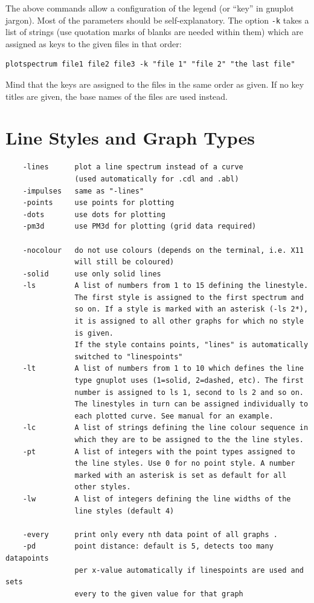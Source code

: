 \documentclass[12pt, a4paper]{article}
\begin{document}
The above commands allow a configuration of the legend (or ``key'' in gnuplot jargon). Most of the parameters should be self-explanatory. The option \verb'-k' takes a list of strings (use quotation marks of blanks are needed within them) which are assigned as keys to the given files in that order:

\begin{verbatim}
plotspectrum file1 file2 file3 -k "file 1" "file 2" "the last file"
\end{verbatim}

Mind that the keys are assigned to the files in the same order as given. If no key titles are given, the base names of the files are used instead.




\section{Line Styles and Graph Types}

\begin{verbatim}
    -lines      plot a line spectrum instead of a curve
                (used automatically for .cdl and .abl) 
    -impulses   same as "-lines"
    -points     use points for plotting 
    -dots       use dots for plotting 
    -pm3d       use PM3d for plotting (grid data required)

    -nocolour   do not use colours (depends on the terminal, i.e. X11
                will still be coloured) 
    -solid      use only solid lines 
    -ls         A list of numbers from 1 to 15 defining the linestyle.
                The first style is assigned to the first spectrum and
                so on. If a style is marked with an asterisk (-ls 2*),
                it is assigned to all other graphs for which no style 
                is given.
                If the style contains points, "lines" is automatically
                switched to "linespoints"
    -lt         A list of numbers from 1 to 10 which defines the line
                type gnuplot uses (1=solid, 2=dashed, etc). The first
                number is assigned to ls 1, second to ls 2 and so on.
                The linestyles in turn can be assigned individually to
                each plotted curve. See manual for an example.
    -lc         A list of strings defining the line colour sequence in
                which they are to be assigned to the the line styles.
    -pt         A list of integers with the point types assigned to 
                the line styles. Use 0 for no point style. A number
                marked with an asterisk is set as default for all
                other styles.
    -lw         A list of integers defining the line widths of the
                line styles (default 4)

    -every      print only every nth data point of all graphs .
    -pd         point distance: default is 5, detects too many datapoints
                per x-value automatically if linespoints are used and sets
                every to the given value for that graph 
\end{verbatim}
\end{document}
